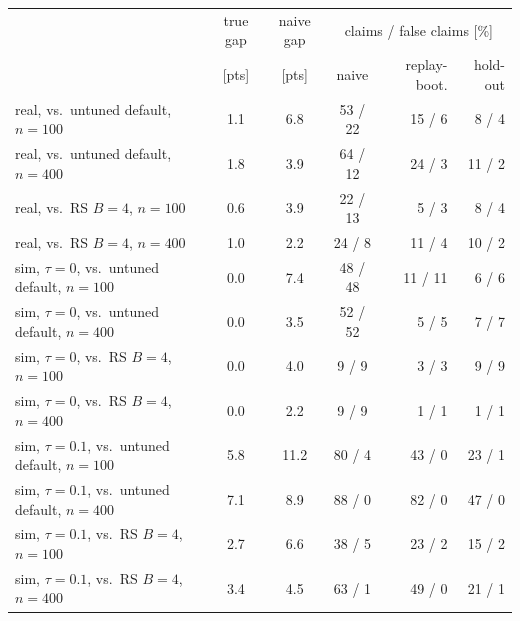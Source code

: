 \begin{tabular}{lcccrr}
\toprule
 & true gap & naive gap & \multicolumn{3}{c}{claims / false claims [\%]} \\
 & [pts] & [pts] & naive & replay-boot. & hold-out \\
\midrule
real, vs.\ untuned default, $n{=}100$ & 1.1 & 6.8 & 53 / 22 & 15 / 6 & 8 / 4 \\
real, vs.\ untuned default, $n{=}400$ & 1.8 & 3.9 & 64 / 12 & 24 / 3 & 11 / 2 \\
real, vs.\ RS $B{=}4$, $n{=}100$ & 0.6 & 3.9 & 22 / 13 & 5 / 3 & 8 / 4 \\
real, vs.\ RS $B{=}4$, $n{=}400$ & 1.0 & 2.2 & 24 / 8 & 11 / 4 & 10 / 2 \\
sim, $\tau{=}0$, vs.\ untuned default, $n{=}100$ & 0.0 & 7.4 & 48 / 48 & 11 / 11 & 6 / 6 \\
sim, $\tau{=}0$, vs.\ untuned default, $n{=}400$ & 0.0 & 3.5 & 52 / 52 & 5 / 5 & 7 / 7 \\
sim, $\tau{=}0$, vs.\ RS $B{=}4$, $n{=}100$ & 0.0 & 4.0 & 9 / 9 & 3 / 3 & 9 / 9 \\
sim, $\tau{=}0$, vs.\ RS $B{=}4$, $n{=}400$ & 0.0 & 2.2 & 9 / 9 & 1 / 1 & 1 / 1 \\
sim, $\tau{=}0.1$, vs.\ untuned default, $n{=}100$ & 5.8 & 11.2 & 80 / 4 & 43 / 0 & 23 / 1 \\
sim, $\tau{=}0.1$, vs.\ untuned default, $n{=}400$ & 7.1 & 8.9 & 88 / 0 & 82 / 0 & 47 / 0 \\
sim, $\tau{=}0.1$, vs.\ RS $B{=}4$, $n{=}100$ & 2.7 & 6.6 & 38 / 5 & 23 / 2 & 15 / 2 \\
sim, $\tau{=}0.1$, vs.\ RS $B{=}4$, $n{=}400$ & 3.4 & 4.5 & 63 / 1 & 49 / 0 & 21 / 1 \\
\bottomrule
\end{tabular}
